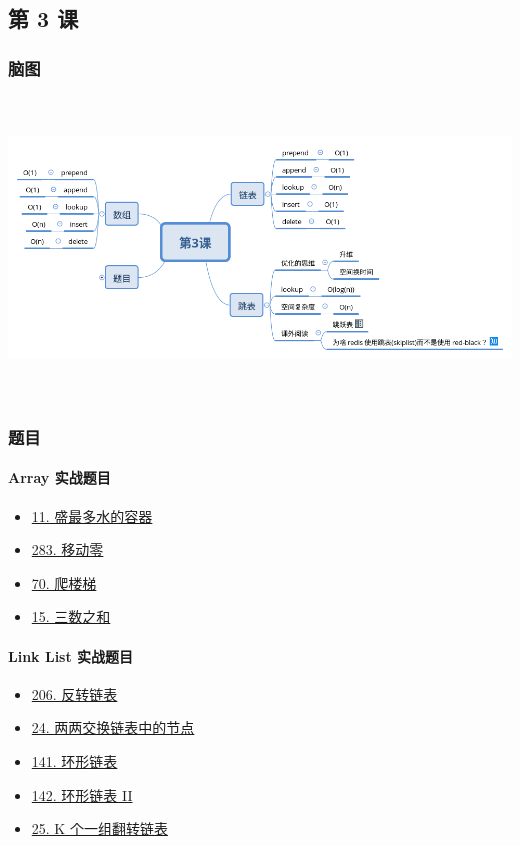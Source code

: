 \subsection{第 3 课}

\subsubsection{脑图}

\includegraphics[width=170mm,height=80mm]{images/第3课.png}

\subsubsection{题目}

\paragraph{Array 实战题目}

\begin{itemize}
  \item \hyperref[leetcode:11]{11. 盛最多水的容器}
  \item \hyperref[leetcode:283]{283. 移动零}
  \item \hyperref[leetcode:70]{70. 爬楼梯}
  \item \hyperref[leetcode:15]{15. 三数之和}
\end{itemize}

\paragraph{Link List 实战题目}

\begin{itemize}
  \item \hyperref[leetcode:206]{206. 反转链表}
  \item \hyperref[leetcode:24]{24. 两两交换链表中的节点}
  \item \hyperref[leetcode:141]{141. 环形链表}
  \item \hyperref[leetcode:142]{142. 环形链表 II}
  \item \hyperref[leetcode:25]{25. K 个一组翻转链表}
\end{itemize}

